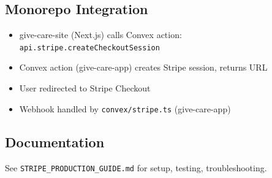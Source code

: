 \documentclass{article}%
\begin{document}
\subsection*{Monorepo Integration}
\begin{itemize}
    \item give-care-site (Next.js) calls Convex action: \texttt{api.stripe.createCheckoutSession}
    \item Convex action (give-care-app) creates Stripe session, returns URL
    \item User redirected to Stripe Checkout
    \item Webhook handled by \texttt{convex/stripe.ts} (give-care-app)
\end{itemize}

\subsection*{Documentation}
See \texttt{STRIPE\_PRODUCTION\_GUIDE.md} for setup, testing, troubleshooting.
%
\end{document}
